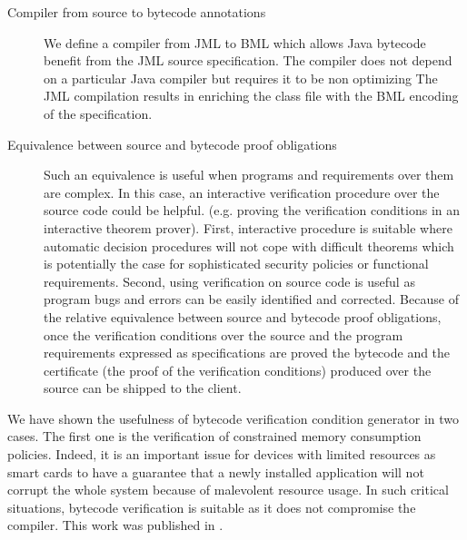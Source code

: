 \begin{description}
 

   \item [Compiler from source to bytecode annotations]
         We define a compiler from JML to BML which  
         allows Java  bytecode benefit from the JML source specification.
         The compiler does not depend on a particular Java compiler but requires it to be non optimizing
         The JML compilation results in enriching the class file with the BML
         encoding of the specification.
         
    \item[Equivalence between source and bytecode proof obligations] Such an equivalence is useful when programs and requirements over them are complex.
         In this case, an interactive verification procedure over the source code  could be helpful.
         (e.g. proving the verification conditions in an interactive theorem prover).
         First, interactive  procedure is suitable where automatic decision procedures will not cope with
         difficult theorems which is potentially the case for sophisticated security policies or functional requirements. 
         Second, using verification on source code is useful as program bugs and errors can be easily identified and corrected.
         Because of the relative equivalence between source and bytecode proof obligations, 
         once the verification conditions over the source and the program requirements expressed as specifications are
         proved the bytecode and the certificate (the proof of the verification conditions) produced over the source
         can be shipped  to the client.


\end{description}


We have shown the usefulness of  bytecode verification condition generator in two cases. The first one is the verification of constrained memory consumption policies.
 Indeed, it is an important issue for devices with limited resources as smart cards to have a guarantee that a newly installed application 
will not corrupt the whole system because of malevolent resource usage. In such critical situations, bytecode verification is suitable
as it does not compromise the compiler. This work was published in \cite{gmg05:sefm}.

